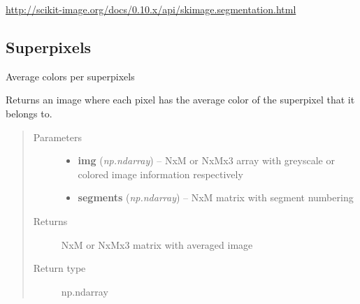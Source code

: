 \documentclass[letterpaper,10pt,english]{sphinxmanual}
\begin{document}


\href{http://scikit-image.org/docs/0.10.x/api/skimage.segmentation.html}{http://scikit-image.org/docs/0.10.x/api/skimage.segmentation.html}




\subsection{Superpixels}
\label{segmentation:superpixels}\label{segmentation:module-flamingo.segmentation.superpixels}

\begin{fulllineitems}
\label{segmentation:flamingo.segmentation.superpixels.average_colors}
Average colors per superpixels

Returns an image where each pixel has the average color of the
superpixel that it belongs to.
\begin{quote}\begin{description}
\item[{Parameters}] \leavevmode\begin{itemize}
\item {} 
\textbf{img} (\emph{np.ndarray}) -- NxM or NxMx3 array with greyscale or colored image information
respectively

\item {} 
\textbf{segments} (\emph{np.ndarray}) -- NxM matrix with segment numbering

\end{itemize}

\item[{Returns}] \leavevmode
NxM or NxMx3 matrix with averaged image

\item[{Return type}] \leavevmode
np.ndarray

\end{description}\end{quote}

\end{fulllineitems}

\end{document}
